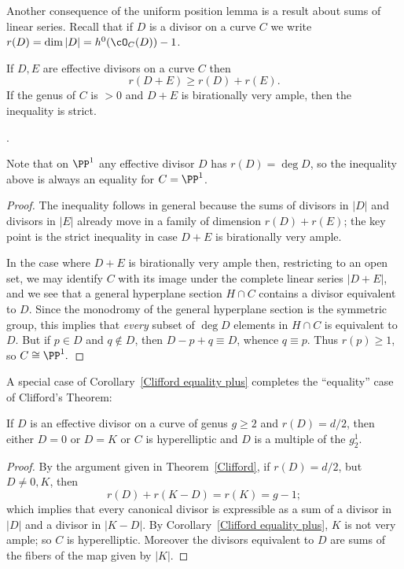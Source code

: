 Another consequence of the uniform position lemma is a result about sums of linear series.
Recall that if $D$ is a divisor on a curve $C$ we write $r(D) = \dim |D| = h^0(\cO_C(D))-1$.

\begin{corollary}\label{Clifford equality plus}
If $D,E$ are effective divisors on a curve $C$ then
$$
r(D+E) \geq r(D)+r(E).
$$
If the genus of $C$ is $>0$ and $D+E$ is birationally very ample, then the inequality is strict.
\end{corollary}.

Note that on $\PP^1$ any effective divisor $D$ has $r(D) = \deg D$, so the inequality above is
always an equality for $C = \PP^1$.

\begin{proof}
 The inequality follows in general because the sums of divisors in $|D|$ and divisors in $|E|$ already move in 
 a family of dimension $r(D)+r(E)$; the key point is the strict inequality in case $D+E$ is birationally very ample.
 
In the case where $D+E$ is birationally very ample then, restricting to an open set,
we may identify $C$ with its image under the complete linear series $|D+E|$, and we see that a general hyperplane section $H\cap C$ contains a divisor equivalent to $D$. Since the monodromy of the general hyperplane section
is the symmetric group, this implies that \emph{every} subset of $\deg D$ elements in $H\cap C$ is
equivalent to $D$. But if $p\in D$ and $q\notin D$, then $D-p+q \equiv D$, whence $q\equiv p$. Thus
$r(p)\geq 1$, so $C\cong \PP^1.$
\end{proof}

A special case of Corollary~\ref{Clifford equality plus} completes the ``equality'' case of Clifford's Theorem:

\begin{corollary}\label{Clifford equality}
If $D$ is an effective divisor on a curve of genus $g\geq 2$ and $r(D) = d/2$, then either $D= 0$ or 
$D=K$ or $C$ is hyperelliptic and $D$ is a multiple of the $g^1_2$.
\end{corollary}

\begin{proof}
  By the argument given in Theorem~\ref{Clifford}, if $r(D) = d/2$, but $D\neq 0,K$, then
$$
r(D) + r(K-D) = r(K) = g-1;
$$
which implies that every canonical divisor is expressible as a sum of a divisor in $|D|$ and a divisor in $|K-D|$.
By Corollary~\ref{Clifford equality plus}, $K$ is not very ample; so $C$ is hyperelliptic. Moreover the
divisors equivalent to $D$ are sums of the fibers of the map given by $|K|$.
\end{proof}

